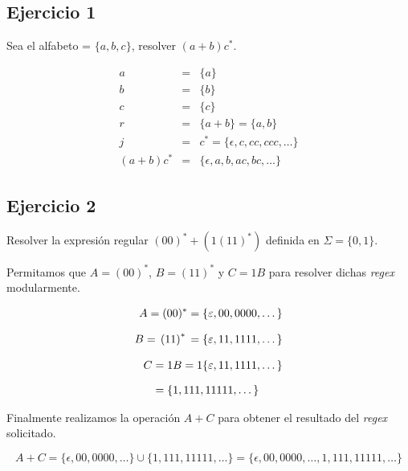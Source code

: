 \documentclass[stu, 12pt, letterpaper, donotrepeattitle, floatsintext, natbib]{apa7}
\begin{document}
\subsection*{Ejercicio 1}
\begin{justifying}
Sea el alfabeto = \(\{a, b, c\}\), resolver \((a+b)c^*\).
\end{justifying}
\begin{equation*}
    \begin{align}
        a & = & \{a\}\\
        b & = & \{b\}\\
        c & = & \{c\}\\
        r & = & \{a+b\} = \{a, b\}\\
        j & = & c^* = \{\epsilon, c, cc, ccc, \dots\}\\
        (a+b)c^* & = & \{\epsilon, a, b, ac, bc, \dots\}
    \end{align}
\end{equation*}
\vspace{\baselineskip}
\subsection*{Ejercicio 2}
\begin{justifying}
Resolver la expresión regular \((00)^{*}+\left(1(11)^{*}\right)\) definida en \(\Sigma=\{0, 1\}\).\par
\vspace{\baselineskip}
Permitamos que \(A=\left(00\right)^*\), \(B=\left(11\right)^{*}\) y \(C=1B\) para resolver dichas \emph{regex}
modularmente.
\end{justifying}
\begin{equation*}
    \setlength{\jot}{10pt}
    \begin{align}
        \begin{split}
            A ={}& (00)^{*} {}=\{\varepsilon, 00, 0000, \dots\} \\
        \end{split}\\
        \begin{split}
            B ={}& \left(11\right)^{*} {}= \{\varepsilon, 11, 1111, \dots\} \\
        \end{split}\\
        \begin{split}
            C ={}& 1B {}= 1\{\varepsilon, 11, 1111, \dots\} \\
              ={}& \{1, 111, 11111, \dots\}\\
        \end{split}
    \end{align}
\end{equation*}\par
\begin{justifying}
Finalmente realizamos la operación \(A+C\) para obtener el resultado del \emph{regex} solicitado.
\end{justifying}
\[A + C = \{\epsilon, 00, 0000, \dots\} \cup \{1, 111, 11111, \dots\} = \{\epsilon, 00, 0000, \dots, 1, 111, 11111, \dots\}\]
\newpage
\end{document}
